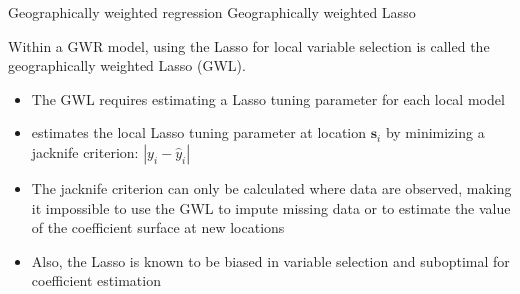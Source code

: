 \documentclass[12pt,t]{beamer}
\newcommand{\subt}[1]{{\footnotesize \color{subtitle} {#1}}}
\begin{document}
\begin{frame}{Geographically weighted regression}
\subt{Geographically weighted Lasso \citep{Wheeler:2009}}

\bigskip
Within a GWR model, using the Lasso for local variable selection is called the geographically weighted Lasso (GWL).
\begin{itemize}
    \item The GWL requires estimating a Lasso tuning parameter for each local model
    \item \citep{Wheeler:2009} estimates the local Lasso tuning parameter at location $\bm{s}_i$ by minimizing a jacknife criterion: $|y_i - \hat{y}_i|$
    \item The jacknife criterion can only be calculated where data are observed, making it impossible to use the GWL to impute missing data or to estimate the value of the coefficient surface at new locations
    \item Also, the Lasso is known to be biased in variable selection and suboptimal for coefficient estimation
\end{itemize}

\end{frame}
\end{document}
